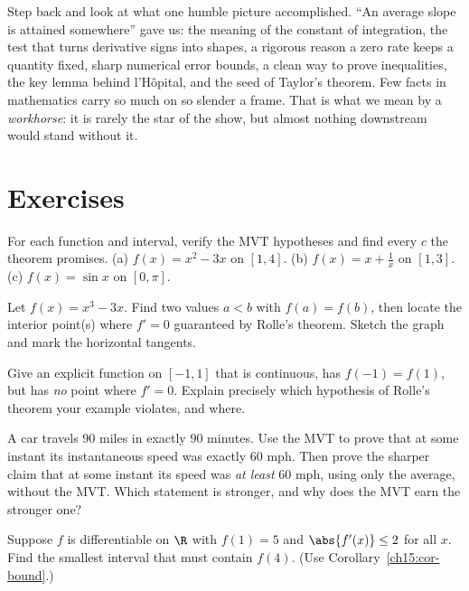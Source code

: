 \begin{aestheticbox}
Step back and look at what one humble picture accomplished. ``An average slope is
attained somewhere'' gave us: the meaning of the constant of integration, the test
that turns derivative signs into shapes, a rigorous reason a zero rate keeps a
quantity fixed, sharp numerical error bounds, a clean way to prove inequalities, the
key lemma behind l'H\^opital, and the seed of Taylor's theorem. Few facts in
mathematics carry so much on so slender a frame. That is what we mean by a
\emph{workhorse}: it is rarely the star of the show, but almost nothing downstream
would stand without it.
\end{aestheticbox}

\section{Exercises}

\begin{exercise}[Finding $c$]
For each function and interval, verify the MVT hypotheses and find every $c$ the
theorem promises.
(a) $f(x)=x^2-3x$ on $[1,4]$.\quad
(b) $f(x)=x+\frac1x$ on $[1,3]$.\quad
(c) $f(x)=\sin x$ on $[0,\pi]$.
\end{exercise}

\begin{exercise}
Let $f(x)=x^3-3x$. Find two values $a<b$ with $f(a)=f(b)$, then locate the interior
point(s) where $f'=0$ guaranteed by Rolle's theorem. Sketch the graph and mark the
horizontal tangents.
\end{exercise}

\begin{exercise}
Give an explicit function on $[-1,1]$ that is continuous, has $f(-1)=f(1)$, but has
\emph{no} point where $f'=0$. Explain precisely which hypothesis of Rolle's theorem
your example violates, and where.
\end{exercise}

\begin{exercise}
A car travels $90$ miles in exactly $90$ minutes. Use the MVT to prove that at some
instant its instantaneous speed was exactly $60$ mph. Then prove the sharper claim
that at some instant its speed was \emph{at least} $60$ mph, using only the average,
without the MVT. Which statement is stronger, and why does the MVT earn the
stronger one?
\end{exercise}

\begin{exercise}
Suppose $f$ is differentiable on $\R$ with $f(1)=5$ and $\abs{f'(x)}\le 2$ for all
$x$. Find the smallest interval that must contain $f(4)$. (Use
Corollary~\ref{ch15:cor-bound}.)
\end{exercise}

